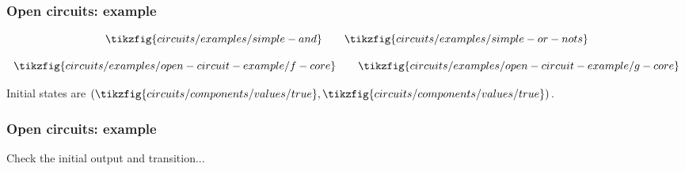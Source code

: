 \begin{frame}
    \frametitle{Open circuits: example}

    \[
        \tikzfig{circuits/examples/simple-and}    
        \qquad
        \tikzfig{circuits/examples/simple-or-nots}
    \]

    \pause

    \[
        \tikzfig{circuits/examples/open-circuit-example/f-core}    
        \qquad
        \tikzfig{circuits/examples/open-circuit-example/g-core}
    \]

    Initial states are \((\tikzfig{circuits/components/values/true}, \tikzfig{circuits/components/values/true})\).

\end{frame}

\begin{frame}
    \frametitle{Open circuits: example}

    Check the \alert{initial output} and \alert{transition}...


\end{frame}
